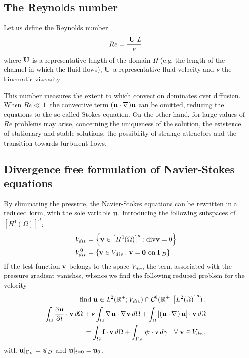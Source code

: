 \subsection{The Reynolds number}
Let us define the Reynolds number, 
\begin{equation*}
    Re = \frac{\abs{\textbf{U}}L}{\nu}
\end{equation*}
where \(\textbf{U}\) is a representative length of the domain \(\Omega\) (e.g. the length of the channel in which the fluid flows), \(\textbf{U}\) a representative fluid velocity and \(\nu\) the kinematic viscosity. 

This number measures the extent to which convection dominates over diffusion. When \(Re \ll 1\), the convective term \((\textbf{u} \cdot \nabla\mspace{1mu})\textbf{u}\) can be omitted, reducing the equations to the so-called Stokes equation. On the other hand, for large values of \(Re\) problems may arise, concerning the uniqueness of the solution, the existence of stationary and stable solutions, the possibility of strange attractors and the transition towards turbulent flows.
\subsection{Divergence free formulation of Navier-Stokes equations}
By eliminating the pressure, the Navier-Stokes equations can be rewritten in a reduced form, with the sole variable \(\textbf{u}\). Introducing the following subspaces of \(\left[ H^1(\Omega) \right]^d\):
\begin{align*}
    &V_{div} = \left\{ \textbf{v} \in \left[ H^1(\Omega) \right]^d : \text{div}\mspace{1mu} \textbf{v} = 0 \right\} \\
    &V_{div}^0 = \left\{ \textbf{v} \in V_{div} : \textbf{v} = \textbf{0} \text{ on }\Gamma_D \right\}
\end{align*}
If the test function \(\textbf{v}\) belongs to the space \(V_{div}\), the term associated with the pressure gradient vanishes, whence we find the following reduced problem for the velocity
\begin{equation}
    \begin{split}
    \find\uvec \in L^2(\real^+; V_{div}) \cap \mathcal{C}^0(\real^+;\left[ L^2(\Omega) \right]^d): \\
        \int_\Omega \partialderivative{\uvec}{t} \cdot \vvec \, d\Omega + \nu \int_\Omega \grad \uvec \cdot \grad \vvec \, d\Omega + \int_\Omega \left[ \left( \uvec \cdot \grad \right)\uvec \right] \cdot \vvec \, d\Omega \\
        = \int_\Omega \vect{f} \cdot \vvec \, d\Omega + \int_{\Gamma_N} \bm{\psi} \cdot \vvec \, d\gamma \quad \forall \; \vvec \in V_{div},
    \end{split}
    \label{10_slide_ns}
\end{equation}
with \(\textbf{u}\vert_{\Gamma_D} = \bm{\psi}_D\) and \(\textbf{u}\vert_{t=0} = \textbf{u}_0\).

